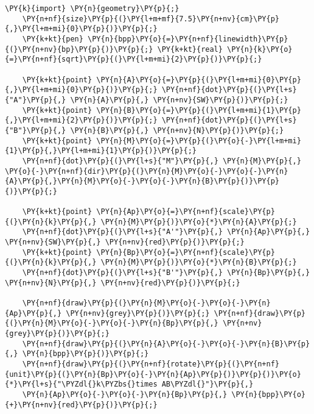\begin{Verbatim}[commandchars=\\\{\}]
    \PY{k}{import} \PY{n}{geometry}\PY{p}{;}
    \PY{n+nf}{size}\PY{p}{(}\PY{l+m+mf}{7.5}\PY{n+nv}{cm}\PY{p}{,}\PY{l+m+mi}{0}\PY{p}{)}\PY{p}{;}
    \PY{k+kt}{pen} \PY{n}{bpp}\PY{o}{=}\PY{n+nf}{linewidth}\PY{p}{(}\PY{n+nv}{bp}\PY{p}{)}\PY{p}{;} \PY{k+kt}{real} \PY{n}{k}\PY{o}{=}\PY{n+nf}{sqrt}\PY{p}{(}\PY{l+m+mi}{2}\PY{p}{)}\PY{p}{;}

    \PY{k+kt}{point} \PY{n}{A}\PY{o}{=}\PY{p}{(}\PY{l+m+mi}{0}\PY{p}{,}\PY{l+m+mi}{0}\PY{p}{)}\PY{p}{;} \PY{n+nf}{dot}\PY{p}{(}\PY{l+s}{"A"}\PY{p}{,} \PY{n}{A}\PY{p}{,} \PY{n+nv}{SW}\PY{p}{)}\PY{p}{;}
    \PY{k+kt}{point} \PY{n}{B}\PY{o}{=}\PY{p}{(}\PY{l+m+mi}{1}\PY{p}{,}\PY{l+m+mi}{2}\PY{p}{)}\PY{p}{;} \PY{n+nf}{dot}\PY{p}{(}\PY{l+s}{"B"}\PY{p}{,} \PY{n}{B}\PY{p}{,} \PY{n+nv}{N}\PY{p}{)}\PY{p}{;}
    \PY{k+kt}{point} \PY{n}{M}\PY{o}{=}\PY{p}{(}\PY{o}{-}\PY{l+m+mi}{1}\PY{p}{,}\PY{l+m+mi}{1}\PY{p}{)}\PY{p}{;}
    \PY{n+nf}{dot}\PY{p}{(}\PY{l+s}{"M"}\PY{p}{,} \PY{n}{M}\PY{p}{,} \PY{o}{-}\PY{n+nf}{dir}\PY{p}{(}\PY{n}{M}\PY{o}{-}\PY{o}{-}\PY{n}{A}\PY{p}{,}\PY{n}{M}\PY{o}{-}\PY{o}{-}\PY{n}{B}\PY{p}{)}\PY{p}{)}\PY{p}{;}

    \PY{k+kt}{point} \PY{n}{Ap}\PY{o}{=}\PY{n+nf}{scale}\PY{p}{(}\PY{n}{k}\PY{p}{,} \PY{n}{M}\PY{p}{)}\PY{o}{*}\PY{n}{A}\PY{p}{;}
    \PY{n+nf}{dot}\PY{p}{(}\PY{l+s}{"A'"}\PY{p}{,} \PY{n}{Ap}\PY{p}{,} \PY{n+nv}{SW}\PY{p}{,} \PY{n+nv}{red}\PY{p}{)}\PY{p}{;}
    \PY{k+kt}{point} \PY{n}{Bp}\PY{o}{=}\PY{n+nf}{scale}\PY{p}{(}\PY{n}{k}\PY{p}{,} \PY{n}{M}\PY{p}{)}\PY{o}{*}\PY{n}{B}\PY{p}{;}
    \PY{n+nf}{dot}\PY{p}{(}\PY{l+s}{"B'"}\PY{p}{,} \PY{n}{Bp}\PY{p}{,} \PY{n+nv}{N}\PY{p}{,} \PY{n+nv}{red}\PY{p}{)}\PY{p}{;}

    \PY{n+nf}{draw}\PY{p}{(}\PY{n}{M}\PY{o}{-}\PY{o}{-}\PY{n}{Ap}\PY{p}{,} \PY{n+nv}{grey}\PY{p}{)}\PY{p}{;} \PY{n+nf}{draw}\PY{p}{(}\PY{n}{M}\PY{o}{-}\PY{o}{-}\PY{n}{Bp}\PY{p}{,} \PY{n+nv}{grey}\PY{p}{)}\PY{p}{;}
    \PY{n+nf}{draw}\PY{p}{(}\PY{n}{A}\PY{o}{-}\PY{o}{-}\PY{n}{B}\PY{p}{,} \PY{n}{bpp}\PY{p}{)}\PY{p}{;}
    \PY{n+nf}{draw}\PY{p}{(}\PY{n+nf}{rotate}\PY{p}{(}\PY{n+nf}{unit}\PY{p}{(}\PY{n}{Bp}\PY{o}{-}\PY{n}{Ap}\PY{p}{)}\PY{p}{)}\PY{o}{*}\PY{l+s}{"\PYZdl{}k\PYZbs{}times AB\PYZdl{}"}\PY{p}{,}
    \PY{n}{Ap}\PY{o}{-}\PY{o}{-}\PY{n}{Bp}\PY{p}{,} \PY{n}{bpp}\PY{o}{+}\PY{n+nv}{red}\PY{p}{)}\PY{p}{;}
\end{Verbatim}
